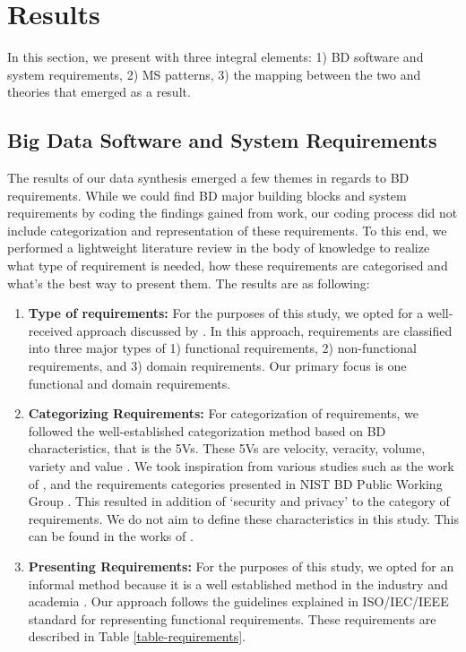 \documentclass[a4paper,11pt,article,oneside]{memoir}
\begin{document}
\chapter{Results}


In this section, we present with three integral elements: 1) BD software and system requirements, 2) MS patterns, 3) the mapping between the two and theories that emerged as a result.  

\section{Big Data Software and System Requirements}\label{requirements}

The results of our data synthesis emerged a few themes in regards to BD requirements. While we could find BD major building blocks and system requirements by coding the findings gained from \citet{ataei2022state} work, our coding process did not include categorization and representation of these requirements. To this end, we performed a lightweight literature review in the body of knowledge to realize what type of requirement is needed, how these requirements are categorised and what's the best way to present them. The results are as following:

\begin{enumerate}
    \item \textbf{Type of requirements:} For the purposes of this study, we opted for a well-received approach discussed by \citet{laplante2017requirements}. In this approach, requirements are classified into three major types of 1) functional requirements, 2) non-functional requirements, and 3) domain requirements. Our primary focus is one functional and domain requirements. 
    \item \textbf{Categorizing Requirements:} For categorization of requirements, we followed the well-established categorization method based on BD characteristics, that is the 5Vs. These 5Vs are velocity, veracity, volume, variety and value \citep{Bughin2016,rad2017big}. We took inspiration from various studies such as the work of \citet{nadal2017software}, and the requirements categories presented in NIST BD Public Working Group \citep{Chang.2019}. This resulted in addition of `security and privacy' to the category of requirements. We do not aim to define these characteristics in this study. This can be found in the works of \citet{rada2017hype}.
    \item \textbf{Presenting Requirements:} For the purposes of this study, we opted for an informal method because it is a well established method in the industry and academia \citep{kassab2014state}. Our approach follows the guidelines explained in ISO/IEC/IEEE standard \citet{ISO29148} for representing functional requirements. These requirements are described in Table \ref{table-requirements}.

\end{enumerate}
\end{document}
